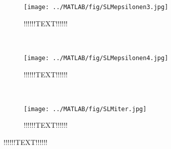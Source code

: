\begin{figure}[H]
        \centering
        \begin{subfigure}[b]{0.3\textwidth}
                \texttt{[image: ../MATLAB/fig/SLMepsilonen3.jpg]}
                \caption{ !!!!!!TEXT!!!!!! }
                \label{fig:SLMepsilonen3}
        \end{subfigure}
        ~
        \begin{subfigure}[b]{0.3\textwidth}
                \texttt{[image: ../MATLAB/fig/SLMepsilonen4.jpg]}
                \caption{ !!!!!!TEXT!!!!!! }
                \label{fig:SLMepsilonen4}
        \end{subfigure}
		~
		\begin{subfigure}[b]{0.3\textwidth}
                \texttt{[image: ../MATLAB/fig/SLMiter.jpg]}
                \caption{ !!!!!!TEXT!!!!!! }
                \label{fig:SLMiter}
        \end{subfigure}

        \caption{ !!!!!!TEXT!!!!!!}
        \label{fig:SLMeps}
\end{figure}
